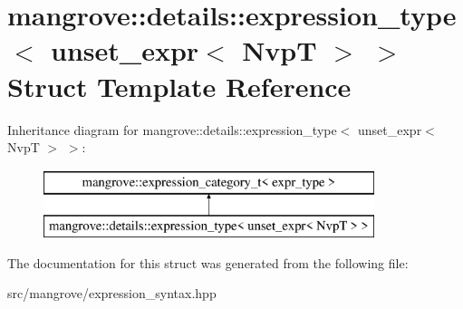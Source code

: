 \hypertarget{structmangrove_1_1details_1_1expression__type_3_01unset__expr_3_01NvpT_01_4_01_4}{}\section{mangrove\+:\+:details\+:\+:expression\+\_\+type$<$ unset\+\_\+expr$<$ NvpT $>$ $>$ Struct Template Reference}
\label{structmangrove_1_1details_1_1expression__type_3_01unset__expr_3_01NvpT_01_4_01_4}
Inheritance diagram for mangrove\+:\+:details\+:\+:expression\+\_\+type$<$ unset\+\_\+expr$<$ NvpT $>$ $>$\+:\begin{figure}[H]
\begin{center}
\leavevmode
\includegraphics[height=2.000000cm]{structmangrove_1_1details_1_1expression__type_3_01unset__expr_3_01NvpT_01_4_01_4}
\end{center}
\end{figure}


The documentation for this struct was generated from the following file\+:\begin{DoxyCompactItemize}
\item 
src/mangrove/expression\+\_\+syntax.\+hpp\end{DoxyCompactItemize}
